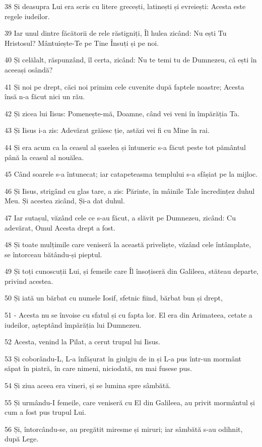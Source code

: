 \par 38 Și deasupra Lui era scris cu litere grecești, latinești și evreiești: Acesta este regele iudeilor.
\par 39 Iar unul dintre făcătorii de rele răstigniți, Îl hulea zicând: Nu ești Tu Hristosul? Mântuiește-Te pe Tine Însuți și pe noi.
\par 40 Și celălalt, răspunzând, îl certa, zicând: Nu te temi tu de Dumnezeu, că ești în aceeași osândă?
\par 41 Și noi pe drept, căci noi primim cele cuvenite după faptele noastre; Acesta însă n-a făcut nici un rău.
\par 42 Și zicea lui Iisus: Pomenește-mă, Doamne, când vei veni în împărăția Ta.
\par 43 Și Iisus i-a zis: Adevărat grăiesc ție, astăzi vei fi cu Mine în rai.
\par 44 Și era acum ca la ceasul al șaselea și întuneric s-a făcut peste tot pământul până la ceasul al nouălea.
\par 45 Când soarele s-a întunecat; iar catapeteasma templului s-a sfâșiat pe la mijloc.
\par 46 Și Iisus, strigând cu glas tare, a zis: Părinte, în mâinile Tale încredințez duhul Meu. Și acestea zicând, Și-a dat duhul.
\par 47 Iar sutașul, văzând cele ce s-au făcut, a slăvit pe Dumnezeu, zicând: Cu adevărat, Omul Acesta drept a fost.
\par 48 Și toate mulțimile care veniseră la această priveliște, văzând cele întâmplate, se întorceau bătându-și pieptul.
\par 49 Și toți cunoscuții Lui, și femeile care Îl însoțiseră din Galileea, stăteau departe, privind acestea.
\par 50 Și iată un bărbat cu numele Iosif, sfetnic fiind, bărbat bun și drept,
\par 51 - Acesta nu se învoise cu sfatul și cu fapta lor. El era din Arimateea, cetate a iudeilor, așteptând împărăția lui Dumnezeu.
\par 52 Acesta, venind la Pilat, a cerut trupul lui Iisus.
\par 53 Și coborându-L, L-a înfășurat în giulgiu de in și L-a pus într-un mormânt săpat în piatră, în care nimeni, niciodată, nu mai fusese pus.
\par 54 Și ziua aceea era vineri, și se lumina spre sâmbătă.
\par 55 Și urmându-I femeile, care veniseră cu El din Galileea, au privit mormântul și cum a fost pus trupul Lui.
\par 56 Și, întorcându-se, au pregătit miresme și miruri; iar sâmbătă s-au odihnit, după Lege.

